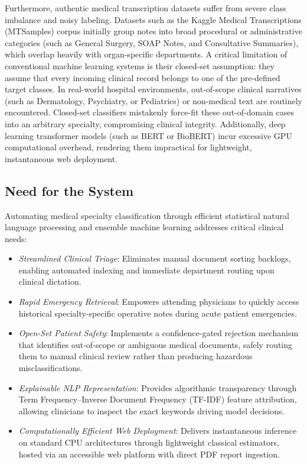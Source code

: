 Furthermore, authentic medical transcription datasets suffer from severe class imbalance and noisy labeling. Datasets such as the Kaggle Medical Transcriptions (MTSamples) corpus initially group notes into broad procedural or administrative categories (such as General Surgery, SOAP Notes, and Consultative Summaries), which overlap heavily with organ-specific departments. A critical limitation of conventional machine learning systems is their closed-set assumption: they assume that every incoming clinical record belongs to one of the pre-defined target classes. In real-world hospital environments, out-of-scope clinical narratives (such as Dermatology, Psychiatry, or Pediatrics) or non-medical text are routinely encountered. Closed-set classifiers mistakenly force-fit these out-of-domain cases into an arbitrary specialty, compromising clinical integrity. Additionally, deep learning transformer models (such as BERT or BioBERT) incur excessive GPU computational overhead, rendering them impractical for lightweight, instantaneous web deployment.

\subsection{Need for the System}
Automating medical specialty classification through efficient statistical natural language processing and ensemble machine learning addresses critical clinical needs:
\begin{itemize}
    \item \textit{Streamlined Clinical Triage}: Eliminates manual document sorting backlogs, enabling automated indexing and immediate department routing upon clinical dictation.
    \item \textit{Rapid Emergency Retrieval}: Empowers attending physicians to quickly access historical specialty-specific operative notes during acute patient emergencies.
    \item \textit{Open-Set Patient Safety}: Implements a confidence-gated rejection mechanism that identifies out-of-scope or ambiguous medical documents, safely routing them to manual clinical review rather than producing hazardous misclassifications.
    \item \textit{Explainable NLP Representation}: Provides algorithmic transparency through Term Frequency--\allowbreak Inverse Document Frequency (TF-IDF) feature attribution, allowing clinicians to inspect the exact keywords driving model decisions.
    \item \textit{Computationally Efficient Web Deployment}: Delivers instantaneous inference on standard CPU architectures through lightweight classical estimators, hosted via an accessible web platform with direct PDF report ingestion.
\end{itemize}

